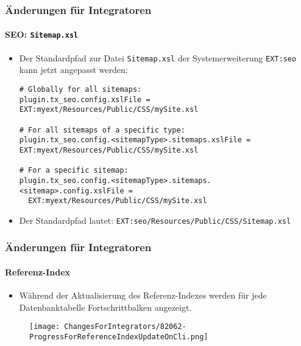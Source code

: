 
\begin{frame}[fragile]
	\frametitle{Änderungen für Integratoren}
	\framesubtitle{SEO: \texttt{Sitemap.xsl}}

	\lstset{basicstyle=\tiny\ttfamily}

	\begin{itemize}
		\item Der Standardpfad zur Datei \texttt{Sitemap.xsl} der Systemerweiterung
			\texttt{EXT:seo} kann jetzt angepasst werden:

\vspace{-0.4cm}
\begin{lstlisting}
# Globally for all sitemaps:
plugin.tx_seo.config.xslFile = EXT:myext/Resources/Public/CSS/mySite.xsl

# For all sitemaps of a specific type:
plugin.tx_seo.config.<sitemapType>.sitemaps.xslFile = EXT:myext/Resources/Public/CSS/mySite.xsl

# For a specific sitemap:
plugin.tx_seo.config.<sitemapType>.sitemaps.<sitemap>.config.xslFile =
  EXT:myext/Resources/Public/CSS/mySite.xsl
\end{lstlisting}

		\item Der Standardpfad lautet:\newline
			\smaller
				\texttt{EXT:seo/Resources/Public/CSS/Sitemap.xsl}
			\normalsize

	\end{itemize}

\end{frame}


\begin{frame}[fragile]
	\frametitle{Änderungen für Integratoren}
	\framesubtitle{Referenz-Index}

	\lstset{basicstyle=\tiny\ttfamily}

	\begin{itemize}
		\item Während der Aktualisierung des Referenz-Indexes werden für jede Datenbanktabelle Fortschrittbalken angezeigt.
	\end{itemize}

	\begin{figure}
		\texttt{[image: ChangesForIntegrators/82062-ProgressForReferenceIndexUpdateOnCli.png]}
	\end{figure}

\end{frame}

